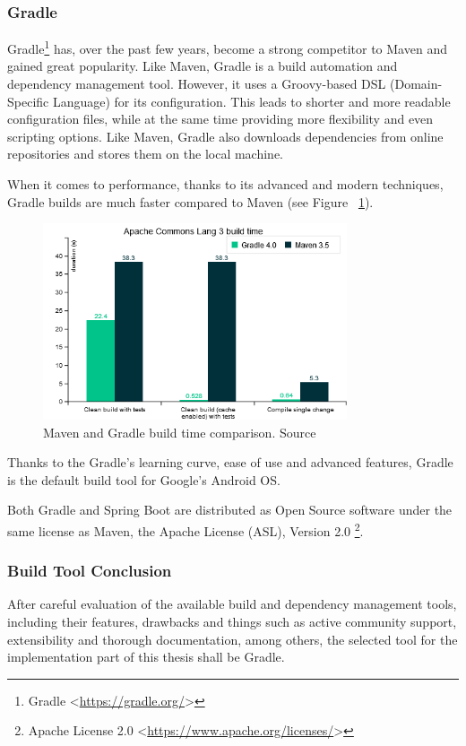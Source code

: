 \subsubsection*{Gradle}
Gradle\footnote{Gradle <\url{https://gradle.org/}>} has, over the past few years, become a strong competitor to Maven and gained great popularity\cite{maven-gradle}. Like Maven, Gradle is a build automation and dependency management tool. However, it uses a Groovy-based DSL (Domain-Specific Language) for its configuration. This leads to shorter and more readable configuration files, while at the same time providing more flexibility and even scripting options. Like Maven, Gradle also downloads dependencies from online repositories and stores them on the local machine.

When it comes to performance, thanks to its advanced and modern techniques, Gradle builds are much faster compared to Maven (see Figure ~\ref{fig:maven-gradle-speed}).

\begin{figure}[!ht]
	\centering
	\includegraphics[width=0.8\textwidth]{figures/02_analysis/maven-gradle-speed}
    \caption{Maven and Gradle build time comparison. Source\cite{maven-vs-gradle}}
    \label{fig:maven-gradle-speed}
\end{figure}

Thanks to the Gradle's learning curve, ease of use and advanced features, Gradle is the default build tool for Google's Android OS.

Both Gradle and Spring Boot are distributed as Open Source software under the same license as Maven, the Apache License (ASL), Version 2.0 \footnote{Apache License 2.0 <\url{https://www.apache.org/licenses/}>}.

\subsubsection*{Build Tool Conclusion}
After careful evaluation of the available build and dependency management tools, including their features, drawbacks and things such as active community support, extensibility and thorough documentation, among others, the selected tool for the implementation part of this thesis shall be Gradle.

